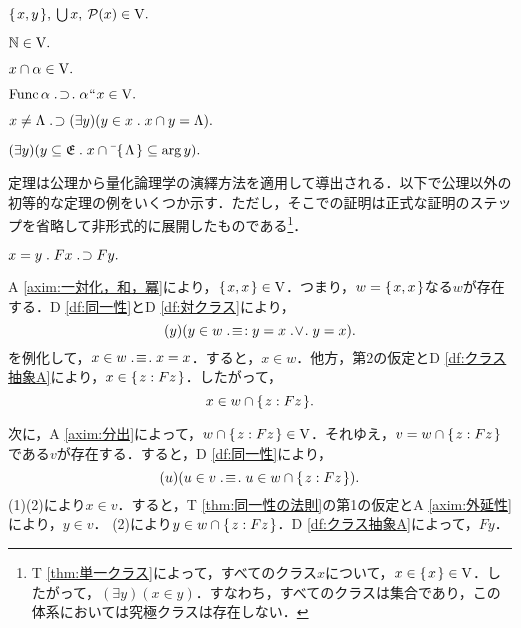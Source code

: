 \begin{axim}[一対化，和，冪]
\label{axim:一対化，和，冪}
$
    \{\mspace{2mu}x,y\mspace{2mu}\},\:{\textstyle\bigcup}\mspace{3mu}x,\:\mathcal{P}(x)\in\mathrm{V}.
$
\end{axim}

\begin{axim}[無限]
\label{axim:無限}
$
    \mathbb{N}\in\mathrm{V}.
$
\end{axim}

\begin{axim}[分出]
\label{axim:分出}
$
    x\cap\alpha\in\mathrm{V}.
$
\end{axim}

\begin{axim}[置換]
\label{axim:置換}
$
    \func\alpha\case{1}{1}{1}\alpha\img x\in\univ.
$
\end{axim}

\begin{axim}[正則性]
\label{axim:正則性}
$
    x\neq \Lambda {\;.\!}\supset (\exists y)(y\in x{\;.\;}x\cap y=\Lambda).
$
\end{axim}

\begin{axim}[選択]
\label{axim:選択}
$
    (\exists y)(
        y\subseteq\mathfrak{E}\con{1}x\cap\barl{\classab{\Lambda}}\subseteq\arg y
    ).
$
\end{axim}

定理は公理から量化論理学の演繹方法を適用して導出される．以下で公理以外の初等的な定理の例をいくつか示す．ただし，そこでの証明は正式な証明のステップを省略して非形式的に展開したものである\footnote{
    T \ref{thm:単一クラス}によって，すべてのクラス$x$について，$x\in\{\mspace{2mu}x\mspace{2mu}\}\in\mathrm{V}$．したがって，$(\exists y)(x\in y)$．すなわち，すべてのクラスは集合であり，この体系においては究極クラスは存在しない．
}．

\begin{thm}[同一性の法則]
\label{thm:同一性の法則}
$
    x=y\con{1}Fx\case{1}{1}{0}Fy.
$
\end{thm}
\setcounter{equation}{0}
\begin{pf}

A \ref{axim:一対化，和，冪}により，$\{\mspace{2mu}x,x\mspace{2mu}\}\in\mathrm{V}$．つまり，$w = \{\mspace{2mu}x,x\mspace{2mu}\}$なる$w$が存在する．D \ref{df:同一性}とD \ref{df:対クラス}により，
\[
    (y)(y\in w\case{3}{1}{2}y=x\case{2}{1}{1}y=x).
\]
を例化して，$x\in w\case{3}{1}{1}x = x$．すると，$x\in w$．他方，第2の仮定とD \ref{df:クラス抽象A}により，$ x\in\{\mspace{2mu}z:Fz\mspace{2mu}\} $．したがって，
\begin{equation}
    x\in w\cap\{\mspace{2mu}z:Fz\mspace{2mu}\}.
\end{equation}

次に，A \ref{axim:分出}によって，$w\cap \{\mspace{2mu}z:Fz\mspace{2mu}\}\in\mathrm{V}$．それゆえ，$v=w\cap \{\mspace{2mu}z:Fz\mspace{2mu}\}$である$v$が存在する．すると，D \ref{df:同一性}により，
\begin{equation}
    (u)(u\in v\case{3}{1}{1}u\in w\cap\classab{z:Fz}).
\end{equation}
(1)(2)により$x\in v$．すると，T \ref{thm:同一性の法則}の第1の仮定とA \ref{axim:外延性}により，$y\in v$．
(2)により$y\in w\cap\{\mspace{2mu}z:Fz\mspace{2mu}\}$．D \ref{df:クラス抽象A}によって，$Fy$．
\end{pf}

